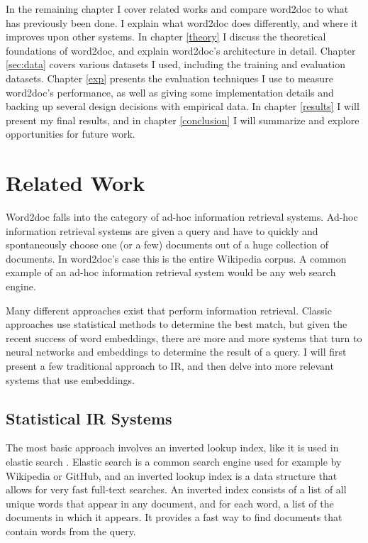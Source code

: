 In the remaining chapter I cover related works and compare word2doc to what has previously been done. I explain what word2doc does
differently, and where it improves upon other systems. In chapter \ref{theory} I discuss the theoretical foundations of word2doc, and
explain word2doc's architecture in detail. Chapter \ref{sec:data} covers various datasets I used, including the training and evaluation
datasets. Chapter \ref{exp} presents the evaluation techniques I use to measure word2doc's performance, as well as giving some
implementation details and backing up several design decisions with empirical data. In chapter \ref{results} I will present my final
results, and in chapter \ref{conclusion} I will summarize and explore opportunities for future work.


\section{Related Work}

Word2doc falls into the category of ad-hoc information retrieval systems. Ad-hoc information retrieval systems are given a query and
have to quickly and spontaneously choose one (or a few) documents out of a huge collection of documents. In word2doc's case this
is the entire Wikipedia corpus. A common example of an ad-hoc information retrieval system would be any web search engine.

Many different approaches exist that perform information retrieval. Classic approaches use statistical methods to determine the best
match, but given the recent success of word embeddings, there are more and more systems that turn to neural networks and embeddings
to determine the result of a query. I will first present a few traditional approach to IR, and then delve into more relevant systems
that use embeddings.


\subsection{Statistical IR Systems}

The most basic approach involves an inverted lookup index, like it is used in elastic search \citep{elasticsearch}. Elastic
search is a common search engine used for example by Wikipedia or GitHub, and an inverted lookup index is a data structure that allows
for very fast full-text searches. An inverted index consists of a list of all unique words that appear in any document, and for
each word, a list of the documents in which it appears. It provides a fast way to find documents that contain words from the query.

